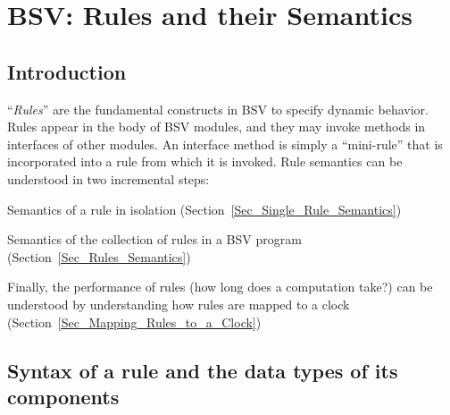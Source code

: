 

\chapter{BSV: Rules and their Semantics}


\setcounter{page}{1}
\renewcommand{\thepage}{\arabic{chapter}-\arabic{page}}

\label{ch_Rules_I}


\section{Introduction}

``\emph{Rules}'' are the fundamental constructs in BSV to specify
dynamic behavior.  Rules appear in the body of BSV modules, and they
may invoke methods in interfaces of other modules.  An interface
method is simply a ``mini-rule'' that is incorporated into a rule from
which it is invoked.  Rule semantics can be understood in two
incremental steps:

\begin{tightlist}

 \item Semantics of a rule in isolation (Section~\ref{Sec_Single_Rule_Semantics})

 \item Semantics of the collection of rules in a BSV program
       (Section~\ref{Sec_Rules_Semantics})

\end{tightlist}

Finally, the performance of rules (how long does a computation take?)
can be understood by understanding how rules are mapped to a clock
(Section~\ref{Sec_Mapping_Rules_to_a_Clock})


\section{Syntax of a rule and the data types of its components}

